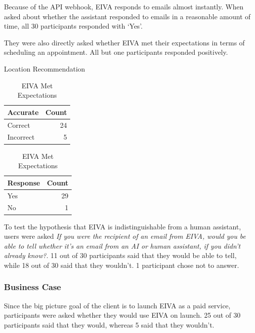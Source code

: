 \documentclass{article}
\begin{document}
Because of the API webhook, EIVA responds to emails almost instantly. When asked about whether the assistant responded to emails in a reasonable amount of time, all 30 participants responded with `Yes'.

They were also directly asked whether EIVA met their expectations in terms of scheduling an appointment. All but one participants responded positively.

\begin{table}[!htb]
	\begin{minipage}{.5\linewidth}
		\caption{Location Recommendation}
		\centering
		\begin{tabular}{lr}
			\hline
			\textbf{Accurate} & \textbf{Count} \\
			\hline
			Correct           & 24             \\
			Incorrect         & 5              \\
			\hline
		\end{tabular}
	\end{minipage}%
	\hspace{.1cm}
	\begin{minipage}{.5\linewidth}
		\centering
		\caption{EIVA Met Expectations}
		\begin{tabular}{lr}
			\hline
			\textbf{Response} & \textbf{Count} \\
			\hline
			Yes               & 29             \\
			No                & 1              \\
			\hline
		\end{tabular}
	\end{minipage} 
\end{table}

To test the hypothesis that EIVA is indistinguishable from a human assistant, users were asked \emph{If you were the recipient of an email from EIVA, would you be able to tell whether it's an email from an AI or human assistant, if you didn't already know?}. 11 out of 30 participants said that they would be able to tell, while 18 out of 30 said that they wouldn't. 1 participant chose not to answer.

\subsubsection{Business Case}

Since the big picture goal of the client is to launch EIVA as a paid service, participants were asked whether they would use EIVA on launch. 25 out of 30 participants said that they would, whereas 5 said that they wouldn't.
\end{document}
